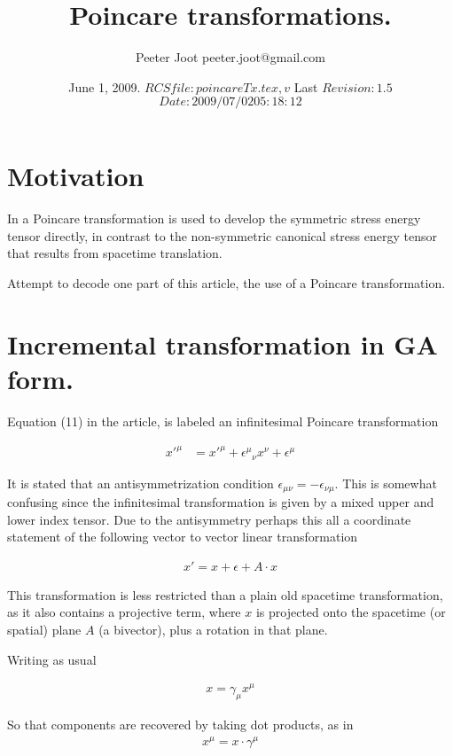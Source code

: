 \documentclass{article}
\title{Poincare transformations.}
\author{Peeter Joot \quad peeter.joot@gmail.com }
\date{ June 1, 2009.  $RCSfile: poincareTx.tex,v $ Last $Revision: 1.5 $ $Date: 2009/07/02 05:18:12 $ }
\begin{document}
\maketitle{}
\tableofcontents
\section{Motivation}

In \cite{montesinos2006sem} a Poincare transformation is used to 
develop the symmetric stress energy tensor directly, in contrast to the
non-symmetric canonical stress energy tensor that results from 
spacetime translation.

Attempt to decode one part of this article, the use of a Poincare transformation.

\section{Incremental transformation in GA form.}

Equation (11) in the article, is labeled an infinitesimal Poincare
transformation

\begin{align}\label{eqn:txComponents}
{x'}^\mu
&=
{x'}^\mu
+ {{\epsilon}^\mu}_\nu x^\nu
+ {\epsilon}^\mu
\end{align}

It is stated that an antisymmetrization condition $\epsilon_{\mu\nu} = -\epsilon_{\nu\mu}$.  This is somewhat confusing 
since the infinitesimal transformation is given by a mixed upper and lower index tensor.   Due to the antisymmetry
perhaps this all a coordinate statement of the following vector to vector linear transformation

\begin{align}\label{eqn:linearTxGuess}
x' = x + \epsilon + A \cdot x
\end{align}

This transformation is less restricted than a plain old spacetime transformation, as it also contains a projective term, where $x$ is projected onto the spacetime (or spatial) plane $A$ (a bivector), plus a rotation in that plane.

Writing as usual

\begin{align*}
x = \gamma_\mu x^\mu
\end{align*}

So that components are recovered by taking dot products, as in
\begin{align*}
x^\mu = x \cdot \gamma^\mu
\end{align*}
\end{document}

